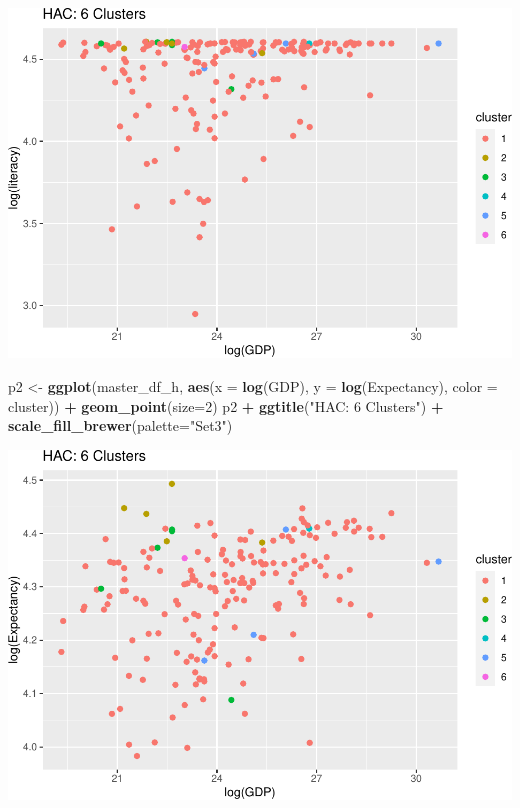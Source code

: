 \documentclass[]{article}
\newenvironment{Shaded}{\begin{snugshade}}{\end{snugshade}}
\newcommand{\DataTypeTok}[1]{\textcolor[rgb]{0.13,0.29,0.53}{#1}}
\newcommand{\DecValTok}[1]{\textcolor[rgb]{0.00,0.00,0.81}{#1}}
\newcommand{\KeywordTok}[1]{\textcolor[rgb]{0.13,0.29,0.53}{\textbf{#1}}}
\newcommand{\NormalTok}[1]{#1}
\newcommand{\OperatorTok}[1]{\textcolor[rgb]{0.81,0.36,0.00}{\textbf{#1}}}
\newcommand{\StringTok}[1]{\textcolor[rgb]{0.31,0.60,0.02}{#1}}
\begin{document}
\includegraphics{eda_files/figure-latex/unnamed-chunk-27-4.pdf}

\begin{Shaded}
\begin{Highlighting}[]
\NormalTok{p2 <-}\StringTok{ }\KeywordTok{ggplot}\NormalTok{(master_df_h, }\KeywordTok{aes}\NormalTok{(}\DataTypeTok{x =} \KeywordTok{log}\NormalTok{(GDP), }\DataTypeTok{y =} \KeywordTok{log}\NormalTok{(Expectancy), }\DataTypeTok{color =}\NormalTok{ cluster)) }\OperatorTok{+}
\StringTok{  }\KeywordTok{geom_point}\NormalTok{(}\DataTypeTok{size=}\DecValTok{2}\NormalTok{)}
\NormalTok{p2 }\OperatorTok{+}\StringTok{ }\KeywordTok{ggtitle}\NormalTok{(}\StringTok{"HAC: 6 Clusters"}\NormalTok{) }\OperatorTok{+}\StringTok{ }\KeywordTok{scale_fill_brewer}\NormalTok{(}\DataTypeTok{palette=}\StringTok{"Set3"}\NormalTok{)}
\end{Highlighting}
\end{Shaded}

\includegraphics{eda_files/figure-latex/unnamed-chunk-27-5.pdf}
\end{document}
